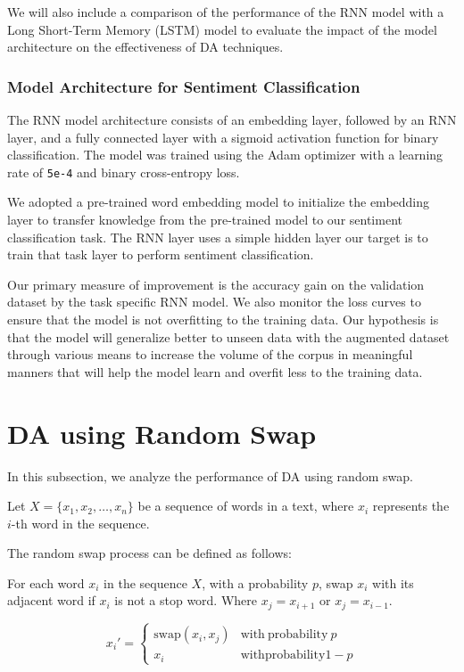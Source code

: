 \documentclass{article}
\newcommand{\code}[1]{\texttt{#1}}
\begin{document}
We will also include a comparison of the performance of the RNN model with a
Long Short-Term Memory (LSTM) model to evaluate the impact of the model
architecture on the effectiveness of DA techniques.

\subsubsection{Model Architecture for Sentiment Classification}

The RNN model architecture consists of an embedding layer, followed by an RNN
layer, and a fully connected layer with a sigmoid activation function for
binary classification. The model was trained using the Adam optimizer with a
learning rate of \code{5e-4} and binary cross-entropy loss.

We adopted a pre-trained word embedding model to initialize the embedding layer
to transfer knowledge from the pre-trained model to our sentiment
classification task. The RNN layer uses a simple hidden layer our target is to
train that task layer to perform sentiment classification.

Our primary measure of improvement is the accuracy gain on the validation
dataset by the task specific RNN model. We also monitor the loss curves to
ensure that the model is not overfitting to the training data. Our hypothesis
is that the model will generalize better to unseen data with the augmented
dataset through various means to increase the volume of the corpus in
meaningful manners that will help the model learn and overfit less to the
training data.

\section{DA using Random Swap}

In this subsection, we analyze the performance of DA using random swap.

Let \( X = \{x_1, x_2, \ldots, x_n\} \) be a sequence of words in a text, where
\( x_i \) represents the \( i \)-th word in the sequence.

The random swap process can be defined as follows:

For each word \( x_i \) in the sequence \( X \), with a probability \( p \),
swap \( x_i \) with its adjacent word if \( x_i \) is not a stop word. Where
\(x_j = x_{i+1}\) or \(x_j = x_{i-1}\).

\[
  x_i' =
  \begin{cases}
    \mathrm{swap}(x_i,x_j) & \mathrm{with\ probability\ } p   \\
    x_i                    & \mathrm{with probability } 1 - p
  \end{cases}
\]
\end{document}
